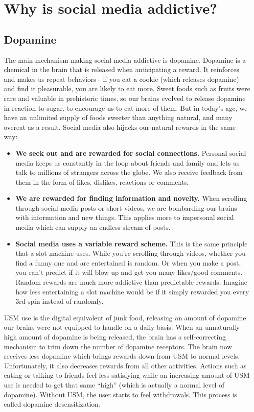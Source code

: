 \documentclass[
  openany]{book}
\providecommand{\tightlist}{%
  \setlength{\itemsep}{0pt}\setlength{\parskip}{0pt}}
\begin{document}
\section{Why is social media addictive?}\label{why-is-social-media-addictive}

\subsection{Dopamine}\label{dopamine}

The main mechanism making social media addictive is dopamine. Dopamine is a chemical in the brain that is released when anticipating a reward. It reinforces and makes us repeat behaviors - if you eat a cookie (which releases dopamine) and find it pleasurable, you are likely to eat more. Sweet foods such as fruits were rare and valuable in prehistoric times, so our brains evolved to release dopamine in reaction to sugar, to encourage us to eat more of them. But in today's age, we have an unlimited supply of foods sweeter than anything natural, and many overeat as a result. Social media also hijacks our natural rewards in the same way:

\begin{itemize}
\tightlist
\item
  \textbf{We seek out and are rewarded for social connections.} Personal social media keeps us constantly in the loop about friends and family and lets us talk to millions of strangers across the globe. We also receive feedback from them in the form of likes, dislikes, reactions or comments.
\item
  \textbf{We are rewarded for finding information and novelty.} When scrolling through social media posts or short videos, we are bombarding our brains with information and new things. This applies more to impersonal social media which can supply an endless stream of posts.
\item
  \textbf{Social media uses a variable reward scheme.} This is the same principle that a slot machine uses. While you're scrolling through videos, whether you find a funny one and are entertained is random. Or when you make a post, you can't predict if it will blow up and get you many likes/good comments. Random rewards are much more addictive than predictable rewards. Imagine how less entertaining a slot machine would be if it simply rewarded you every 3rd spin instead of randomly.
\end{itemize}

USM use is the digital equivalent of junk food, releasing an amount of dopamine our brains were not equipped to handle on a daily basis. When an unnaturally high amount of dopamine is being released, the brain has a self-correcting mechanism to trim down the number of dopamine receptors. The brain now receives less dopamine which brings rewards down from USM to normal levels. Unfortunately, it also decreases rewards from all other activities. Actions such as eating or talking to friends feel less satisfying while an increasing amount of USM use is needed to get that same ``high'' (which is actually a normal level of dopamine). Without USM, the user starts to feel withdrawals. This process is called dopamine desensitization.
\end{document}
